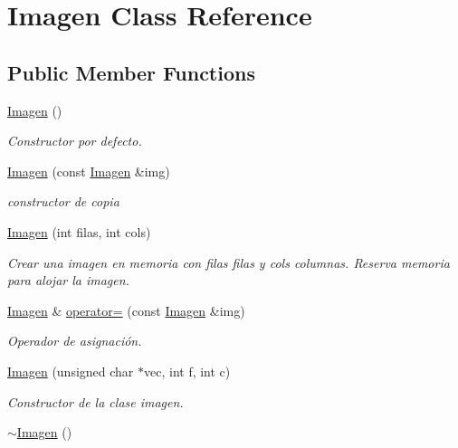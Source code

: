 \hypertarget{classImagen}{}\section{Imagen Class Reference}
\label{classImagen}
\subsection*{Public Member Functions}
\begin{DoxyCompactItemize}
\item 
\mbox{\label{classImagen_ab2e649aa7a105155c7bfdb846abf0528}} 
\hyperlink{classImagen_ab2e649aa7a105155c7bfdb846abf0528}{Imagen} ()
\begin{DoxyCompactList}\small\item\em Constructor por defecto. \end{DoxyCompactList}\item 
\hyperlink{classImagen_aebf637b27aa4c1bcefbec6b61f28a1b2}{Imagen} (const \hyperlink{classImagen}{Imagen} \&img)
\begin{DoxyCompactList}\small\item\em constructor de copia \end{DoxyCompactList}\item 
\hyperlink{classImagen_ad4943ff0e2de31d4c25a879030f3ebf2}{Imagen} (int filas, int cols)
\begin{DoxyCompactList}\small\item\em Crear una imagen en memoria con filas filas y cols columnas. Reserva memoria para alojar la imagen. \end{DoxyCompactList}\item 
\hyperlink{classImagen}{Imagen} \& \hyperlink{classImagen_a43d10ec74966d22e5477f686462802dc}{operator=} (const \hyperlink{classImagen}{Imagen} \&img)
\begin{DoxyCompactList}\small\item\em Operador de asignación. \end{DoxyCompactList}\item 
\hyperlink{classImagen_adb28de653c8e4afda018be3c87a081a6}{Imagen} (unsigned char $\ast$vec, int f, int c)
\begin{DoxyCompactList}\small\item\em Constructor de la clase imagen. \end{DoxyCompactList}\item 
\hyperlink{classImagen_a03dd93c9cf920a9dc0b72f8bd34f2e8a}{$\sim$\+Imagen} ()

\end{DoxyCompactItemize}
